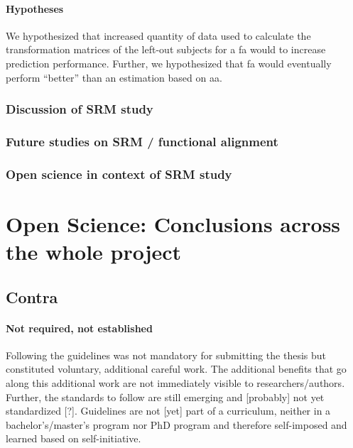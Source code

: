 \paragraph{Hypotheses}
%
We hypothesized that increased quantity of data used to calculate the
transformation matrices of the left-out subjects for a \ac{fa} would to increase
prediction performance.
%
Further, we hypothesized that \ac{fa} would eventually perform
``better'' than an estimation based on \ac{aa}.



\subsubsection{Discussion of SRM study}




\subsubsection{Future studies on SRM / functional alignment}




\subsubsection{Open science in context of SRM study}








\section{Open Science: Conclusions across the whole project}


\subsection{Contra}

\paragraph{Not required, not established}
%
Following the guidelines was not mandatory for submitting the thesis but
constituted voluntary, additional careful work.
%
The additional benefits that go along this additional work are not immediately
visible to researchers/authors.
%
Further, the standards to follow are still emerging and [probably] not yet
standardized [?].
%
Guidelines are not [yet] part of a curriculum, neither in a bachelor's/master's
program nor PhD program and therefore self-imposed and learned based on
self-initiative.


